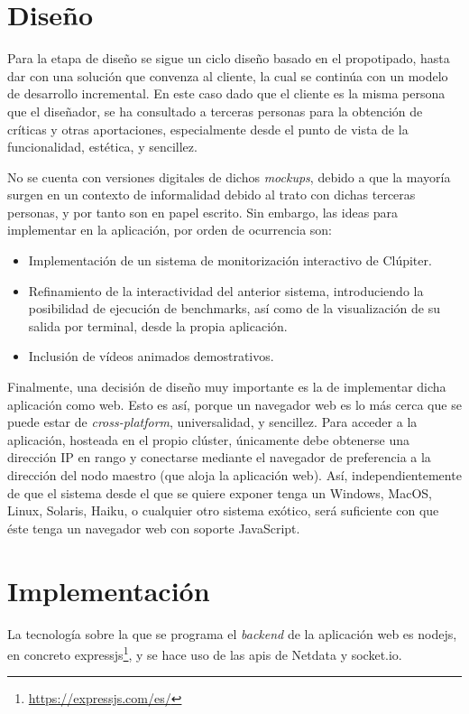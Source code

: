 \section{Diseño}
\label{sec:contenido_didactico__diseño}
Para la etapa de diseño se sigue un ciclo diseño basado en el propotipado, hasta dar con una solución que convenza al cliente, la cual se continúa con un modelo de desarrollo incremental. En este caso dado que el cliente es la misma persona que el diseñador, se ha consultado a terceras personas para la obtención de críticas y otras aportaciones, especialmente desde el punto de vista de la funcionalidad, estética, y sencillez.

No se cuenta con versiones digitales de dichos \textit{mockups}, debido a que la mayoría surgen en un contexto de informalidad debido al trato con dichas terceras personas, y por tanto son en papel escrito. Sin embargo, las ideas para implementar en la aplicación, por orden de ocurrencia son:

\begin{itemize}
  \item Implementación de un sistema de monitorización interactivo de Clúpiter.
  \item Refinamiento de la interactividad del anterior sistema, introduciendo la posibilidad de ejecución de benchmarks, así como de la visualización de su salida por terminal, desde la propia aplicación.
  \item Inclusión de vídeos animados demostrativos.
\end{itemize}

Finalmente, una decisión de diseño muy importante es la de implementar dicha aplicación como web. Esto es así, porque un navegador web es lo más cerca que se puede estar de \textit{cross-platform}, universalidad, y sencillez. Para acceder a la aplicación, hosteada en el propio clúster, únicamente debe obtenerse una dirección IP en rango y conectarse mediante el navegador de preferencia a la dirección del nodo maestro (que aloja la aplicación web). Así, independientemente de que el sistema desde el que se quiere exponer tenga un Windows, MacOS, Linux, Solaris, Haiku, o cualquier otro sistema exótico, será suficiente con que éste tenga un navegador web con soporte JavaScript.

\section{Implementación}
La tecnología sobre la que se programa el \textit{\gls{backend}} de la aplicación web es nodejs, en concreto expressjs\footnote{\url{https://expressjs.com/es/}}, y se hace uso de las \acrshort{api}s de Netdata y socket.io.

